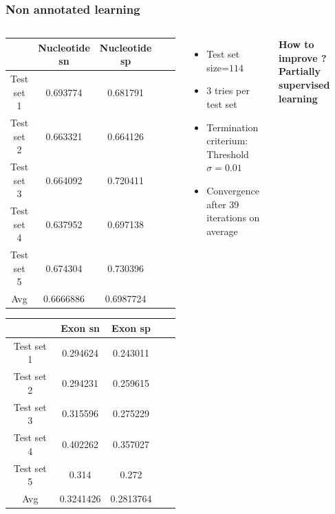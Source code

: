 \documentclass{beamer}[12pt]
\begin{document}
\begin{frame}
\frametitle{Non annotated learning}
\begin{columns}

		\begin{scriptsize}
		\begin{table}[h!]
		
		\begin{tabular}{|c|c|c|c|c|}
		
			\hline
				&Nucleotide sn	& Nucleotide sp\\	
			\hline
				Test set 1	& 0.693774	& 0.681791\\
			\hline
				Test set 2	& 0.663321	& 0.664126\\
			\hline
				Test set 3	& 0.664092	& 0.720411\\
			\hline
				Test set 4	& 0.637952	& 0.697138\\
			\hline
				Test set 5	& 0.674304	& 0.730396\\
			\hline
				Avg		& 0.6666886	& 0.6987724\\
			\hline	
			
					
		\end{tabular}
		\vspace{0.5 cm}
		
		\begin{tabular}{|c|c|c|c|c|}
		
			\hline
				& Exon sn	& Exon sp\\
			\hline
				Test set 1& 0.294624	& 0.243011\\
			\hline
				Test set 2	& 0.294231	& 0.259615	\\
			\hline
				Test set 3	& 0.315596	& 0.275229\\
			\hline
				Test set 4	& 0.402262	& 0.357027\\
			\hline
				Test set 5	& 0.314		& 0.272\\
			\hline
				Avg		& 0.3241426	& 0.2813764\\
			\hline	
			
					
		\end{tabular}
		
		\end{table}
		

		\end{scriptsize}
		
		
		\begin{itemize}
			\item Test set size=$114$
			\item $3$ tries per test set
			\item Termination criterium: Threshold $\sigma=0.01$
			\item Convergence after 39 iterations on average
		\end{itemize}
		\vspace{0.5 cm}
		 
		 \centering\textbf{How to improve ? Partially supervised learning}
\end{columns}


\end{frame}
\end{document}
